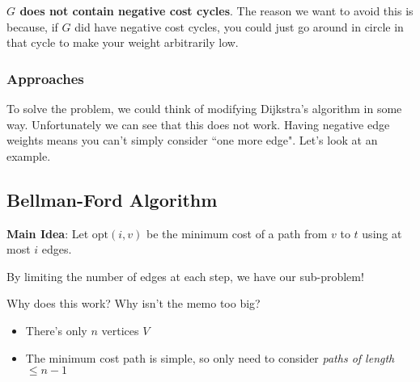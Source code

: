 \documentclass[12pt]{article}
\def\opt{\text{opt}}
\begin{document}
  {\bf $G$ does not contain negative cost cycles}. The reason we want to avoid
  this is because, if $G$ did have negative cost cycles, you could just go
  around in circle in that cycle to make your weight arbitrarily low.


  \subsubsection{Approaches}

  To solve the problem, we could think of modifying Dijkstra's algorithm in some
  way. Unfortunately we can see that this does not work. Having negative edge
  weights means you can't simply consider ``one more edge". Let's look at an
  example.


  \subsection{Bellman-Ford Algorithm}

  {\bf Main Idea}: Let $\opt(i, v)$ be the minimum cost of a path from $v$ to
  $t$ using at most $i$ edges.

  By limiting the number of edges at each step, we have our sub-problem!

  Why does this work? Why isn't the memo too big?
  \begin{itemize}
    \item There's only $n$ vertices $V$
    \item The minimum cost path is simple, so only need to consider {\it paths
      of length $\le n - 1$}
  \end{itemize}
\end{document}
